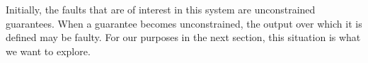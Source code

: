 Initially, the faults that are of interest in this system are unconstrained guarantees. When a guarantee becomes unconstrained, the output over which it is defined may be faulty. For our purposes in the next section, this situation is what we want to explore. 


